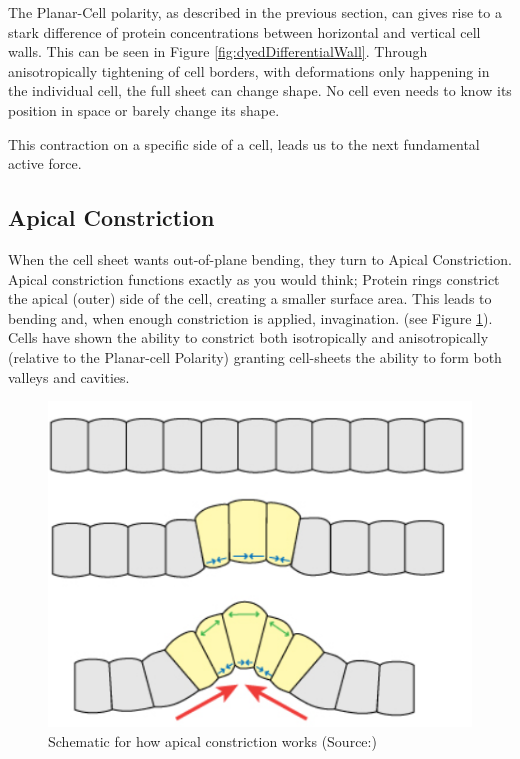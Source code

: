 The Planar-Cell polarity, as described in the previous section, can gives rise to a stark difference of protein concentrations between horizontal and vertical cell walls. This can be seen in Figure \ref{fig:dyedDifferentialWall}.
Through anisotropically tightening of cell borders, with deformations only happening in the individual cell, the full sheet can change shape. No cell even needs to know its position in space or barely change its shape. 

This contraction on a specific side of a cell, leads us to the next fundamental active force.



\subsection{ Apical Constriction }
\label{sec:ApicalConstriction}
When the cell sheet wants out-of-plane bending, they turn to Apical Constriction. Apical constriction functions exactly as you would think; Protein rings constrict the apical (outer) side of the cell, creating a smaller surface area. This leads to bending and, when enough constriction is applied, invagination. (see Figure \ref{fig:apical-constriction}). Cells have shown the ability to constrict both isotropically and anisotropically (relative to the Planar-cell Polarity) granting cell-sheets the ability to form both valleys and cavities.

\begin{figure}[H]
    \centering
    \includegraphics[width=0.3\linewidth]{chapters/Theory/figures/apical_constriction_schematic.png}
    \caption{Schematic for how apical constriction works (Source:\todo{})}
    \label{fig:apical-constriction}
\end{figure}


